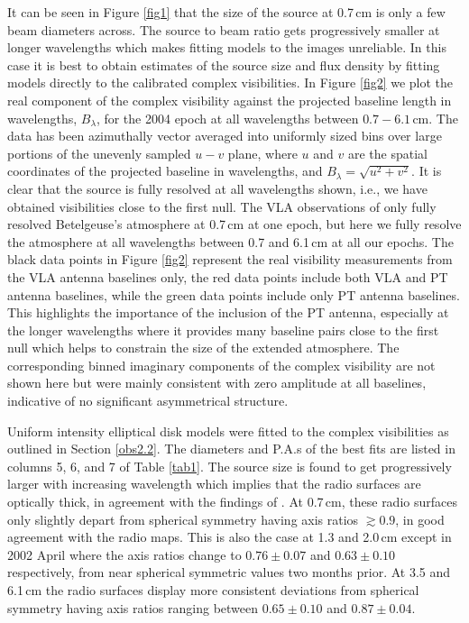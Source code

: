 \documentclass[iop]{emulateapj}
\begin{document}
It can be seen in Figure \ref{fig1} that the size of the source at 0.7\,cm is only a few beam diameters across. The source to beam ratio gets progressively smaller at longer wavelengths which makes fitting models to the images unreliable. In this case it is best to obtain estimates of the source size and flux density by fitting models directly to the calibrated complex visibilities. In Figure \ref{fig2} we plot the real component of the complex visibility against the projected baseline length in wavelengths, $B_{\lambda}$, for the 2004 epoch at all wavelengths between $0.7-6.1$\,cm. The data has been azimuthally vector averaged into uniformly sized bins over large portions of the unevenly sampled $u-v$ plane, where $u$ and $v$ are the spatial coordinates of the projected baseline in wavelengths, and $B_{\lambda} = \sqrt{u^2 + v^2}$. It is clear that the source is fully resolved at all wavelengths shown, i.e., we have obtained visibilities close to the first null. The VLA observations of \cite{lim_1998} only fully resolved Betelgeuse's atmosphere at 0.7\,cm at one epoch, but here we fully resolve the atmosphere at all wavelengths between 0.7 and 6.1\,cm at all our epochs. The black data points in Figure \ref{fig2} represent the real visibility measurements from the VLA antenna baselines only, the red data points include both VLA and PT antenna baselines, while the green data points include only PT antenna baselines. This highlights the importance of the inclusion of the PT antenna, especially at the longer wavelengths where it provides many baseline pairs close to the first null which helps to constrain the size of the extended atmosphere. The corresponding binned imaginary components of the complex visibility are not shown here but were mainly consistent with zero amplitude at all baselines, indicative of no significant asymmetrical structure. 

Uniform intensity elliptical disk models were fitted to the complex visibilities as outlined in Section \ref{obs2.2}. The diameters and P.A.s of the best fits are listed in columns 5, 6, and 7 of Table \ref{tab1}. The source size is found to get progressively larger with increasing wavelength which implies that the radio surfaces are optically thick, in agreement with the findings of \cite{lim_1998}. At 0.7\,cm, these radio surfaces only slightly depart from spherical symmetry having axis ratios $\gtrsim 0.9$, in good agreement with the radio maps. This is also the case at 1.3 and 2.0\,cm except in 2002 April where the axis ratios change to $0.76\pm 0.07$ and $0.63\pm 0.10$ respectively, from near spherical symmetric values two months prior. At 3.5 and 6.1\,cm the radio surfaces display more consistent deviations from spherical symmetry having axis ratios ranging between $0.65\pm 0.10$ and $0.87\pm 0.04$. 
\end{document}
